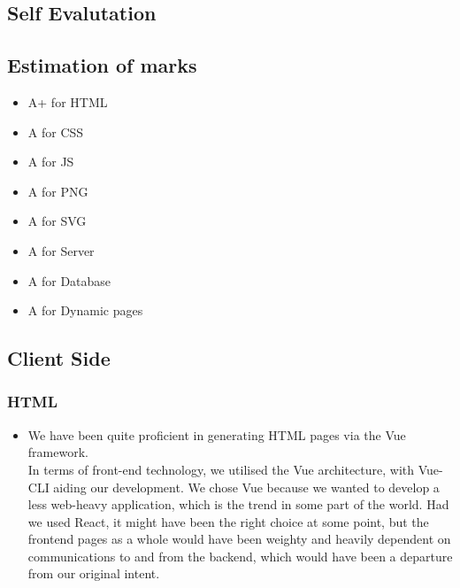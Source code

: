 \documentclass[11pt]{article}
\begin{document}
\begin{spacing}{1.0}
	\section{Self Evalutation}
	\subsection{Estimation of marks}
\begin{itemize}
	\item A+ for HTML
	\item A for CSS
	\item A for JS
	\item A for PNG	
	\item A for SVG
	\item A for Server
	\item A for Database
	\item A for Dynamic pages
\end{itemize}
	\subsection{Client Side}
	\subsubsection{HTML}
	\begin{itemize}
  		\item We have been quite proficient in generating HTML pages via the Vue framework. \\

	\hspace{\parindent}In terms of front-end technology, we utilised the Vue architecture, with Vue-CLI aiding our development. We chose Vue because we wanted to develop a less web-heavy application, which is the trend in some part of the world. Had we used React, it might have been the right choice at some point, but the frontend pages as a whole would have been weighty and heavily dependent on communications to and from the backend, which would have been a departure from our original intent.
	

\end{itemize}
\end{spacing}
\end{document}
